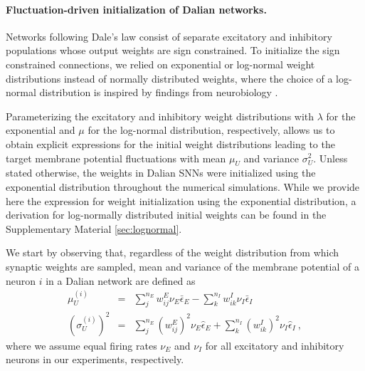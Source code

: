 \documentclass[11pt,a4paper]{article}
\begin{document}
\paragraph{Fluctuation-driven initialization of Dalian networks.} Networks
following Dale's law consist of separate excitatory and inhibitory populations whose output weights are sign constrained.
To initialize the sign constrained connections, we relied on exponential or log-normal weight distributions instead of normally distributed weights, where the choice of a log-normal distribution is inspired by
findings from neurobiology \citep{buzsaki_log-dynamic_2014}.

Parameterizing the excitatory and inhibitory weight distributions with $\lambda$ for the exponential and $\mu$ for the log-normal distribution, respectively, allows us to obtain explicit expressions for the initial weight distributions leading to the target membrane potential fluctuations with mean $\mu_U$ and variance $\sigma_U^2$. 
Unless stated otherwise, the weights in Dalian \acp{SNN} were initialized using the exponential distribution throughout the numerical simulations. While we provide here the expression for weight initialization using the exponential distribution, a derivation for log-normally distributed initial weights can be found in the Supplementary Material \ref{sec:lognormal}.

We start by observing that, regardless of the weight distribution from which synaptic weights are sampled, mean and variance of the membrane potential of a neuron $i$ in a Dalian network are
defined as
\begin{eqnarray}
\mu_U^{(i)} &=& \sum_j^{n_E} w^{E}_{ij} \nu_E \bar\epsilon_E -
\sum_k^{n_I}
w^{I}_{ik} \nu_I \bar\epsilon_I
\\
\left(\sigma^{(i)}_U\right)^2 &=& \sum_j^{n_E} (w^{E}_{ij})^2 \nu_E
\hat{\epsilon}_{E} +
\sum_k^{n_I} (w^{I}_{ik})^2 \nu_I \hat{\epsilon}_{I} ~,
\end{eqnarray}
where we assume equal firing rates $\nu_E$ and $\nu_I$ for all excitatory and
inhibitory neurons in our experiments, respectively.
\end{document}
